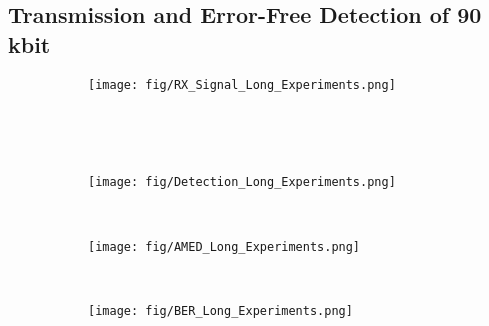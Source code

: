 \subsection{Transmission and Error-Free Detection of 90 kbit}\label{sec:error_free_80kbit}
\scaleSubsectionBelow
%
\begin{figure}[!tbp]
    \vspace{-1cm}
    \centering
    \begin{subfigure}[b]{1\textwidth}
        \vspace{-0.cm}
        \texttt{[image: fig/RX\_Signal\_Long\_Experiments.png]}
    \end{subfigure}\\
    \vspace{-6.7cm}
    \begin{subfigure}[b]{1\textwidth} %
        \caption{}
        \label{fig:long_term_time}
    \end{subfigure}\\
    \vspace{5.5cm}
    \begin{subfigure}[b]{1\textwidth}
        \caption{}
        \vspace{-0.cm}
        \texttt{[image: fig/Detection\_Long\_Experiments.png]}
        \label{fig:long_term_correlation}
        \vspace*{-8mm}
    \end{subfigure}\\
    \vspace{-0.4cm}
    \begin{subfigure}[b]{1\textwidth}
        \caption{}
        \vspace{-0.cm}
        \texttt{[image: fig/AMED\_Long\_Experiments.png]}
        \label{fig:long_term_med}
        \vspace*{-8mm}
    \end{subfigure}\\
    \vspace{-0.4cm}
    \begin{subfigure}[b]{1\textwidth}
        \caption{}
        \vspace{-0.1cm}
        \texttt{[image: fig/BER\_Long\_Experiments.png]}
        \label{fig:long_term_ber}
        \vspace*{-8mm}
    \end{subfigure}
    \vspace{-0.8cm}

\end{figure}
